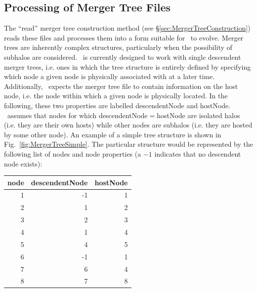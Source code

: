 \subsection{Processing of Merger Tree Files}\label{sec:MergerTreeFileProcessing}

The ``read'' merger tree construction method (see \S\ref{sec:MergerTreeConstruction}) reads these files and processes them into a form suitable for \glc\ to evolve. Merger trees are inherently complex structures, particularly when the possibility of subhalos are considered. \glc\ is currently designed to work with single descendent merger trees, i.e. ones in which the tree structure is entirely defined by specifying which \gls{node} a given \gls{node} is physically associated with at a later time. Additionally, \glc\ expects the merger tree file to contain information on the host \gls{node}, i.e. the node within which a given node is physically located. In the following, these two properties are labelled {\normalfont \ttfamily descendentNode} and {\normalfont \ttfamily hostNode}. \glc\ assumes that nodes for which {\normalfont \ttfamily descendentNode}$=${\normalfont \ttfamily hostNode} are isolated halos (i.e. they are their own hosts) while other nodes are subhalos (i.e. they are hosted by some other node). An example of a simple tree structure is shown in Fig.~\ref{fig:MergerTreeSimple}. The particular structure would be represented by the following list of nodes and node properties (a $-1$ indicates that no descendent node exists):
\begin{center}
\begin{tabular}{rrr}
\hline
{\normalfont \ttfamily node} & {\normalfont \ttfamily descendentNode} & {\normalfont \ttfamily hostNode} \\
\hline
1 & -1 & 1 \\
2 &  1 & 2 \\
3 &  2 & 3 \\
4 &  1 & 4 \\
5 &  4 & 5 \\
6 & -1 & 1 \\
7 &  6 & 4 \\
8 &  7 & 8 \\
\hline
\end{tabular}
\end{center}

